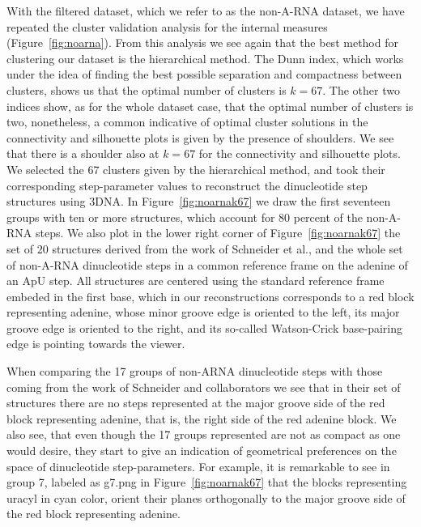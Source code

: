 With the filtered dataset, which we refer to as the non-A-RNA dataset,
we  have repeated  the cluster  validation analysis  for  the internal
measures  (Figure~\ref{fig:noarna}). From this  analysis we  see again
that the  best method for  clustering our dataset is  the hierarchical
method. The Dunn index, which works under the idea of finding the best
possible separation  and compactness  between clusters, shows  us that
the optimal number of clusters  is $k=67$. The other two indices show,
as for the whole dataset case,  that the optimal number of clusters is
two, nonetheless, a common  indicative of optimal cluster solutions in
the  connectivity and  silhouette plots  is given  by the  presence of
shoulders.  We  see that there  is a shoulder  also at $k=67$  for the
connectivity and  silhouette plots. We selected the  67 clusters given
by   the   hierarchical   method,   and   took   their   corresponding
step-parameter values to  reconstruct the dinucleotide step structures
using 3DNA.  In Figure~\ref{fig:noarnak67} we draw the first seventeen
groups with  ten or more structures,  which account for  80 percent of
the  non-A-RNA steps.   We  also plot  in  the lower  right corner  of
Figure~\ref{fig:noarnak67} the  set of 20 structures  derived from the
work  of Schneider et  al.\cite{schneider2004}, and  the whole  set of
non-A-RNA  dinucleotide  steps in  a  common  reference  frame on  the
adenine  of  an ApU  step.   All  structures  are centered  using  the
standard  reference frame  embeded in  the  first base,  which in  our
reconstructions corresponds to a red block representing adenine, whose
minor groove  edge is oriented to  the left, its major  groove edge is
oriented  to the  right, and  its so-called  Watson-Crick base-pairing
edge is pointing towards the viewer.

When comparing the 17 groups of non-ARNA dinucleotide steps with those
coming from  the work  of Schneider and  collaborators we see  that in
their set  of structures there are  no steps represented  at the major
groove side of the red  block representing adenine, that is, the right
side of  the red adenine block. We  also see, that even  though the 17
groups represented are not as  compact as one would desire, they start
to  give an  indication of  geometrical  preferences on  the space  of
dinucleotide step-parameters.  For example, it is remarkable to see in
group  7, labeled  as  g7.png in  Figure~\ref{fig:noarnak67} that  the
blocks  representing  uracyl  in   cyan  color,  orient  their  planes
orthogonally to  the major groove  side of the red  block representing
adenine.

